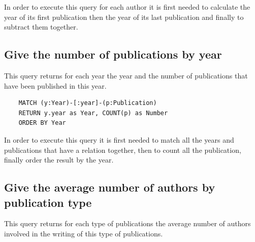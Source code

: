 \documentclass{article}
\begin{document}
In order to execute this query for each author it is first needed to calculate the year of its first publication then the year of its last publication and finally to subtract them together.

\subsection{Give the number of publications by year}
This query returns for each year the year and the number of publications that have been published in this year.

\begin{lstlisting}
    MATCH (y:Year)-[:year]-(p:Publication)
    RETURN y.year as Year, COUNT(p) as Number
    ORDER BY Year
\end{lstlisting}

In order to execute this query it is first needed to match all the years and publications that have a relation together, then to count all the publication, finally order the result by the year.

\subsection{Give the average number of authors by publication type}
This query returns for each type of publications the average number of authors involved in the writing of this type of publications.
\end{document}
